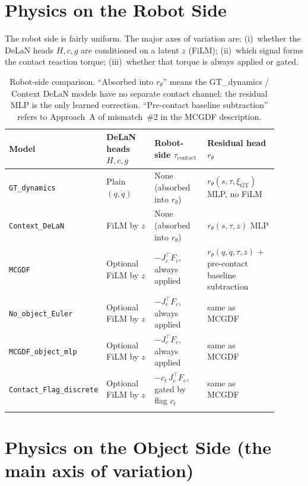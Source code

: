 \documentclass[11pt]{article}
\begin{document}
\section{Physics on the Robot Side}

The robot side is fairly uniform.  The major axes of variation are:
(i)~whether the DeLaN heads $H, c, g$ are conditioned on a latent
$z$ (FiLM); (ii)~which signal forms the contact reaction torque;
(iii)~whether that torque is always applied or gated.

\begin{longtable}{p{0.18\linewidth} p{0.20\linewidth} p{0.22\linewidth} p{0.30\linewidth}}
\toprule
Model & DeLaN heads $H, c, g$ & Robot-side $\tau_{\mathrm{contact}}$ & Residual head $r_\theta$ \\
\midrule
\texttt{GT\_dynamics}            & Plain $(q, \dot q)$            & None (absorbed into $r_\theta$)                & $r_\theta(s, \tau, \xi_{\mathrm{GT}})$ MLP, no FiLM \\
\texttt{Context\_DeLaN}          & FiLM by $z$                    & None (absorbed into $r_\theta$)                & $r_\theta(s, \tau, z)$ MLP \\
\texttt{MCGDF}                   & Optional FiLM by $z$           & $-J_c^\top F_c$, always applied                & $r_\theta(q, \dot q, \tau, z)$ + pre-contact baseline subtraction \\
\texttt{No\_object\_Euler}       & Optional FiLM by $z$           & $-J_c^\top F_c$, always applied                & same as MCGDF \\
\texttt{MCGDF\_object\_mlp}      & Optional FiLM by $z$           & $-J_c^\top F_c$, always applied                & same as MCGDF \\
\texttt{Contact\_Flag\_discrete} & Optional FiLM by $z$           & $-c_t\,J_c^\top F_c$, gated by flag $c_t$      & same as MCGDF \\
\bottomrule
\caption{Robot-side comparison.  ``Absorbed into $r_\theta$'' means
the GT\_dynamics / Context DeLaN models have no separate contact
channel: the residual MLP is the only learned correction.  ``Pre-contact
baseline subtraction'' refers to Approach~A of mismatch~\#2 in
the MCGDF description.}
\label{tab:cmp-robot}
\end{longtable}

\section{Physics on the Object Side (the main axis of variation)}
\end{document}
